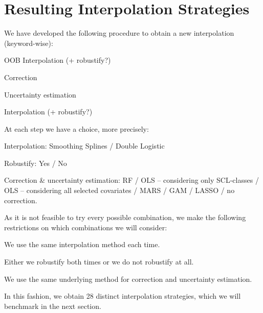 \section{Resulting Interpolation Strategies}{
    \label{sec:corr_itpl_stat}
    We have developed the following procedure to obtain a new interpolation (keyword-wise):
    \begin{Nenumerate}
        \item OOB Interpolation (+ robustify?)
        \item Correction 
        \item Uncertainty estimation
        \item Interpolation (+ robustify?)
    \end{Nenumerate}
    At each step we have a choice, more precisely:
    \begin{Nitemize}
        \item Interpolation: Smoothing Splines / Double Logistic
        \item Robustify: Yes / No
        \item Correction \& uncertainty estimation: RF / OLS -- considering only SCL-classes / OLS -- considering all selected covariates / MARS / GAM / LASSO / no correction.
    \end{Nitemize}
    As it is not feasible to try every possible combination, we make the following restrictions on which combinations we will consider:
    \begin{Nitemize}
        \item We use the same interpolation method each time.
        \item Either we robustify both times or we do not robustify at all.
        \item We use the same underlying method for correction and uncertainty estimation.
    \end{Nitemize}

    In this fashion, we obtain 28 distinct interpolation strategies, which we will benchmark in the next section.
}

